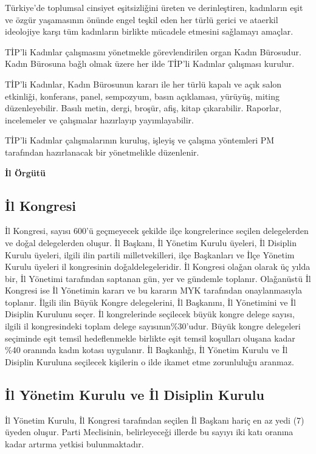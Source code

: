 \documentclass[11pt]{article} %
\begin{document}
Türkiye’de toplumsal cinsiyet eşitsizliǧini üreten ve derinleştiren, kadınların eşit ve özgür yaşamasının önünde engel teşkil eden her türlü gerici ve ataerkil ideolojiye karşı tüm kadınların birlikte mücadele etmesini saǧlamayı amaçlar.

TİP’li Kadınlar çalışmasını yönetmekle görevlendirilen organ Kadın Bürosudur. Kadın Bürosuna baǧlı olmak üzere her ilde TİP’li Kadınlar çalışması kurulur.

TİP’li Kadınlar, Kadın Bürosunun kararı ile her türlü kapalı ve açık salon etkinliǧi, konferans, panel, sempozyum, basın açıklaması, yürüyüş, miting düzenleyebilir. Basılı metin, dergi, broşür, afiş, kitap çıkarabilir. Raporlar, incelemeler ve çalışmalar hazırlayıp yayımlayabilir.

TİP’li Kadınlar çalışmalarının kuruluş, işleyiş ve çalışma yöntemleri PM tarafından hazırlanacak bir yönetmelikle düzenlenir.

\hfill \break
\textbf{\Large İl Örgütü}

\subsection{İl Kongresi}
İl Kongresi, sayısı 600’ü geçmeyecek şekilde ilçe kongrelerince seçilen delegelerden ve doǧal delegelerden oluşur. İl Başkanı, İl Yönetim Kurulu üyeleri, İl Disiplin Kurulu üyeleri, ilgili ilin partili milletvekilleri, ilçe Başkanları ve İlçe Yönetim Kurulu üyeleri il kongresinin doǧaldelegeleridir.
İl Kongresi olaǧan olarak üç yılda bir, İl Yönetimi tarafından saptanan gün, yer
ve gündemle toplanır. Olaǧanüstü İl Kongresi ise İl Yönetimin kararı ve bu kararın MYK tarafından onaylanmasıyla toplanır. İlgili ilin Büyük Kongre delegelerini, İl Başkanını, İl Yönetimini ve İl Disiplin Kurulunu seçer.
İl kongrelerinde seçilecek büyük kongre delege sayısı, ilgili il kongresindeki toplam delege sayısının\%30’udur. Büyük kongre delegeleri seçiminde eşit temsil hedeflenmekle birlikte eşit temsil koşulları oluşana kadar \%40 oranında kadın kotası uygulanır.
İl Başkanlıǧı, İl Yönetim Kurulu ve İl Disiplin Kuruluna seçilecek kişilerin o ilde
ikamet etme zorunluluǧu aranmaz.

\subsection{İl Yönetim Kurulu ve İl Disiplin Kurulu}
İl Yönetim Kurulu, İl Kongresi tarafından seçilen İl Başkanı hariç en az yedi (7) üyeden oluşur. Parti Meclisinin, belirleyeceǧi illerde bu sayıyı iki katı oranına kadar artırma yetkisi bulunmaktadır.
\end{document}
